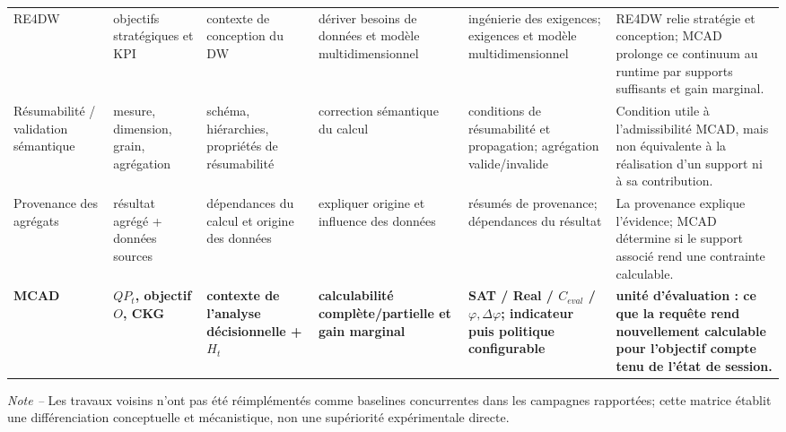 \begin{table}[!t]
\begin{tabularx}{\textwidth}{@{}p{2.05cm}p{2.15cm}p{2.05cm}p{2.25cm}p{3.45cm}X@{}}
RE4DW~\cite{NasiriAhmedWrembelZimanyi2017} & objectifs stratégiques et KPI & contexte de conception du DW & dériver besoins de données et modèle multidimensionnel & ingénierie des exigences; exigences et modèle multidimensionnel & RE4DW relie stratégie et conception; MCAD prolonge ce continuum au runtime par supports suffisants et gain marginal. \\
Résumabilité / validation sémantique~\cite{SimonAmannLiuGancarski2023} & mesure, dimension, grain, agrégation & schéma, hiérarchies, propriétés de résumabilité & correction sémantique du calcul & conditions de résumabilité et propagation; agrégation valide/invalide & Condition utile à l'admissibilité MCAD, mais non équivalente à la réalisation d'un support ni à sa contribution. \\
Provenance des agrégats~\cite{AlOmeirLaiMilaniPottinger2023} & résultat agrégé + données sources & dépendances du calcul et origine des données & expliquer origine et influence des données & résumés de provenance; dépendances du résultat & La provenance explique l'évidence; MCAD détermine si le support associé rend une contrainte calculable. \\
\textbf{MCAD} & \textbf{$QP_t$, objectif $O$, CKG} & \textbf{contexte de l'analyse décisionnelle + $H_t$} & \textbf{calculabilité complète/partielle et gain marginal} & \textbf{SAT / Real / $C_{eval}$ / $\varphi,\Delta\varphi$; indicateur puis politique configurable} & \textbf{unité d'évaluation : ce que la requête rend nouvellement calculable pour l'objectif compte tenu de l'état de session.} \\
\bottomrule
\end{tabularx}
\vspace{0.7mm}
\begin{minipage}{0.985\textwidth}
\footnotesize\emph{Note --} Les travaux voisins n'ont pas été réimplémentés comme baselines concurrentes dans les campagnes rapportées; cette matrice établit une différenciation conceptuelle et mécanistique, non une supériorité expérimentale directe.
\end{minipage}
\normalsize
\end{table}
